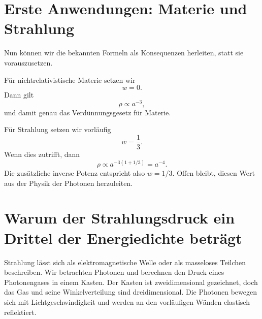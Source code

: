 \section{Erste Anwendungen: Materie und Strahlung}

Nun können wir die bekannten Formeln als Konsequenzen herleiten, statt sie vorauszusetzen.

Für nichtrelativistische Materie setzen wir
\begin{equation}
w=0.
\end{equation}
Dann gilt
\begin{equation}
\rho\propto a^{-3},
\end{equation}
und damit genau das Verdünnungsgesetz für Materie.

Für Strahlung setzen wir vorläufig
\begin{equation}
w=\frac13.
\end{equation}
Wenn dies zutrifft, dann
\begin{equation}
\rho\propto a^{-3(1+1/3)}=a^{-4}.
\end{equation}
Die zusätzliche inverse Potenz entspricht also \(w=1/3\). Offen bleibt, diesen Wert aus der Physik der Photonen herzuleiten.

\section{Warum der Strahlungsdruck ein Drittel der Energiedichte beträgt}

Strahlung lässt sich als elektromagnetische Welle oder als masseloses Teilchen beschreiben. Wir betrachten Photonen und berechnen den Druck eines Photonengases in einem Kasten. Der Kasten ist zweidimensional gezeichnet, doch das Gas und seine Winkelverteilung sind dreidimensional. Die Photonen bewegen sich mit Lichtgeschwindigkeit und werden an den vorläufigen Wänden elastisch reflektiert.

